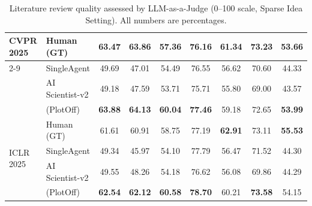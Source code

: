 \begin{table}[tbp]
{\begin{tabular}{llccccccc}
        \midrule
        \multirow{4}{*}{CVPR 2025} 
        & Human (GT)   & 63.47 & 63.86 & 57.36 & 76.16 & \textbf{61.34} & \textbf{73.23} & 53.66 \\
        \cmidrule{2-9}
        & SingleAgent     & 49.69 & 47.01 & 54.49 & 76.55 & 56.62 & 70.60 & 44.33 \\
        & AI Scientist-v2 & 49.18 & 47.59 & 53.71 & 75.71 & 55.80 & 69.00 & 43.57 \\
        & \ourmethod{} (PlotOff)     & \cellcolor{best_color}\textbf{63.88} & \cellcolor{best_color}\textbf{64.13} & \cellcolor{best_color}\textbf{60.04} & \cellcolor{best_color}\textbf{77.46} & \cellcolor{best_color}59.18 & \cellcolor{best_color}72.65 & \cellcolor{best_color}\textbf{53.99} \\
        \midrule
        \multirow{4}{*}{ICLR 2025} 
        & Human (GT)   & 61.61 & 60.91 & 58.75 & 77.19 & \textbf{62.91} & 73.11 & \textbf{55.53} \\
        \cmidrule{2-9}
        & SingleAgent     & 49.34 & 45.97 & 54.10 & 77.79 & 56.47 & 71.52 & 44.30 \\
        & AI Scientist-v2 & 49.55 & 48.26 & 54.18 & 76.62 & 56.08 & 69.86 & 44.29 \\
        & \ourmethod{} (PlotOff)     & \cellcolor{best_color}\textbf{62.54} & \cellcolor{best_color}\textbf{62.12} & \cellcolor{best_color}\textbf{60.58} & \cellcolor{best_color}\textbf{78.70} & \cellcolor{best_color}60.21& \cellcolor{best_color}\textbf{73.58} & \cellcolor{best_color}54.15 \\
        \bottomrule
    \end{tabular}
    }
    \caption{Literature review quality assessed by LLM-as-a-Judge (0--100 scale, Sparse Idea Setting). All numbers are percentages.}
    \label{tab:lit_review_quality}
\end{table}